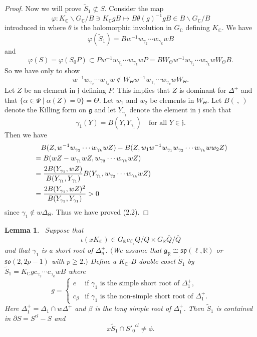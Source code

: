 \documentclass[12pt,a4paper]{amsart}
\def\frak{\mathfrak}
\newtheorem{lemma}[theorem]{Lemma}
\theoremstyle{definition}
\theoremstyle{remark}
\numberwithin{equation}{section}
\def\br{\mathbb R}
\def\bc{\mathbb C}
\def\p{\partial}
\begin{document}
\begin{proof}
Now we will prove $\widetilde{S}_1\not\subset S$. Consider the map
$$\varphi:K_\bc\backslash G_\bc/B\ni K_\bc gB\mapsto B\theta(g)^{-1}gB\in B\backslash G_\bc/B$$
introduced in \cite{Sp} where $\theta$ is the holomorphic involution in $G_\bc$ defining $K_\bc$. We have
$$\varphi(\widetilde{S}_1)=Bw^{-1}w_{\gamma_2}\cdots w_{\gamma_k}wB$$
and
$$\varphi(S) =\varphi(S_0P)\subset Pw^{-1}w_{\gamma_1}\cdots w_{\gamma_k}wP =BW_\Theta w^{-1}w_{\gamma_1}\cdots w_{\gamma_k}wW_\Theta B.$$
So we have only to show
\begin{equation}
w^{-1}w_{\gamma_2}\cdots w_{\gamma_k}w\notin W_\Theta w^{-1}w_{\gamma_1}\cdots w_{\gamma_k}wW_\Theta. \tag{2.2}
\end{equation}
Let $Z$ be an element in $\frak{j}$ defining $P$. This implies that $Z$ is dominant for $\Delta^+$ and that $\{\alpha\in\Psi\mid \alpha(Z)=0\}=\Theta$. Let $w_1$ and $w_2$ be elements in $W_\Theta$. Let $B(\ ,\ )$ denote the Killing form on $\frak{g}$ and let $Y_{\gamma_1}$ denote the element in $\frak{j}$ such that
$$\gamma_1(Y)=B(Y,Y_{\gamma_1})\quad\mbox{for all }Y\in\frak{j}.$$
Then we have
\begin{align*}
& \quad B(Z,w^{-1}w_{\gamma_2}\cdots w_{\gamma_k}wZ)- B(Z,w_1w^{-1}w_{\gamma_1}w_{\gamma_2}\cdots w_{\gamma_k}ww_2Z) \\
& =B(wZ-w_{\gamma_1}wZ,w_{\gamma_2}\cdots w_{\gamma_k}wZ) \\
& ={2B(Y_{\gamma_1},wZ)\over B(Y_{\gamma_1},Y_{\gamma_1})}B(Y_{\gamma_1}, w_{\gamma_2}\cdots w_{\gamma_k}wZ) \\
& ={2B(Y_{\gamma_1},wZ)^2\over B(Y_{\gamma_1},Y_{\gamma_1})}>0
\end{align*}
since $\gamma_1\notin w\Delta_\Theta$. Thus we have proved (2.2).
\end{proof}

\begin{lemma} \ Suppose that 
$$\iota(xK_\bc)\in G_\br c_{\beta_1}Q/Q\times G_\br\overline{Q}/\overline{Q}$$
and that $\gamma_1$ is a short root of $\Delta_n^+$. $($We assume that $\frak{g}_\br\cong \frak{sp}(\ell,\br)$ or $\frak{so}(2,2p-1)$ with $p\ge 2$.$)$ Define a $K_\bc$-$B$ double coset $\widetilde{S}_1$ by
$\widetilde{S}_1=K_\bc gc_{\gamma_2}\cdots c_{\gamma_k}wB$
where
$$g=\begin{cases} e & \text{if $\gamma_1$ is the simple short root of $\Delta_1^+$,} \\
c_\beta & \text{if $\gamma_1$ is the non-simple short root of $\Delta_1^+$.} \end{cases}$$
Here $\Delta_1^+=\Delta_1\cap w\Delta^+$ and $\beta$ is the long simple root of $\Delta_1^+$.
Then $\widetilde{S}_1$ is contained in $\p S=S^{cl}-S$ and
$$x\widetilde{S}_1\cap {S'_0}^{cl}\ne\phi.$$
\end{lemma}
\end{document}
